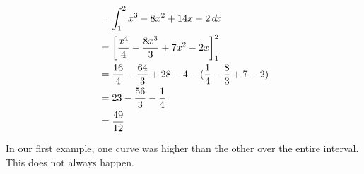 \documentclass{ximera}
\begin{document}
\begin{example}
\begin{explanation}
\begin{hint}
\begin{align*}
  &=\int_1^2 x^3-8x^2+14x-2 \mathop{}\!d\! x \\
  &=\bigg[ \frac{x^4}{4}-\frac{8x^3}{3}+7x^2-2x \bigg]_1^2 \\
  &= \frac{16}{4} - \frac{64}{3}+28-4-(\frac{1}{4}- \frac{8}{3}+7-2) \\
  &=23-\frac{56}{3}-\frac{1}{4}\\
  &=\frac{49}{12}
\end{align*}
\end{hint}

\end{explanation}

\end{example}




In our first example, one curve was higher than the other over the
entire interval. This does not always happen.
\end{document}
